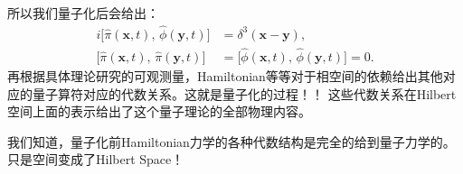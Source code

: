 
所以我们量子化后会给出：
\begin{align}
  i\bigl[\hat{\pi}(\mathbf{x},t),\,\hat{\phi}(\mathbf{y},t)\bigr] &=
  \delta^{3}(\mathbf{x}-\mathbf{y}), \\[4pt]
  \bigl[\hat{\pi}(\mathbf{x},t),\,\hat{\pi}(\mathbf{y},t)\bigr]
  &= \bigl[\hat{\phi}(\mathbf{x},t),\,\hat{\phi}(\mathbf{y},t)\bigr] = 0.
\end{align}
再根据具体理论研究的可观测量，Hamiltonian等等对于相空间的依赖给出其他对应的量子算符对应的代数关系。这就是量子化的过程！！
这些代数关系在Hilbert空间上面的表示给出了这个量子理论的全部物理内容。

\bigskip
{}

我们知道，量子化前Hamiltonian力学的各种代数结构是完全的给到量子力学的。只是空间变成了Hilbert Space！

